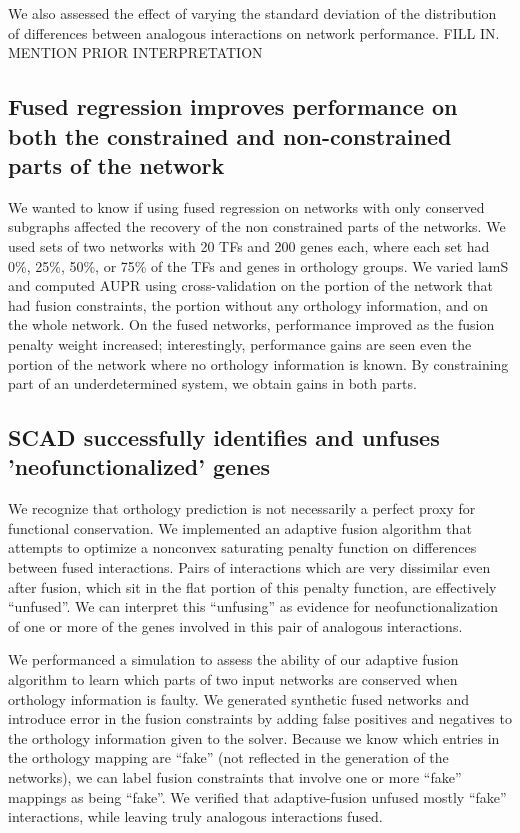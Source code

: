 \documentclass[11pt]{article}
\begin{document}
We also assessed the effect of varying the standard deviation of the distribution of differences between analogous interactions on network performance. FILL IN. MENTION PRIOR INTERPRETATION

\subsection{Fused regression improves performance on both the constrained and non-constrained parts of the network}
We wanted to know if using fused regression on networks with only conserved subgraphs affected the recovery of the non constrained parts of the networks. We used sets of two networks with 20 TFs and 200 genes each, where each set had 0\%, 25\%, 50\%, or 75\% of the TFs and genes in orthology groups. We varied lamS and computed AUPR using cross-validation on the portion of the network that had fusion constraints, the portion without any orthology information, and on the whole network. On the fused networks, performance improved as the fusion penalty weight increased; interestingly, performance gains are seen even the portion of the network where no orthology information is known. By constraining part of an underdetermined system, we obtain gains in both parts. 

\subsection{SCAD successfully identifies and unfuses 'neofunctionalized' genes}
We recognize that orthology prediction is not necessarily a perfect proxy for functional conservation. We implemented an adaptive fusion algorithm that attempts to optimize a nonconvex saturating penalty function on differences between fused interactions. Pairs of interactions which are very dissimilar even after fusion, which sit in the flat portion of this penalty function, are effectively ``unfused''. We can interpret this ``unfusing'' as evidence for neofunctionalization of one or more of the genes involved in this pair of analogous interactions. 

We performanced a simulation to assess the ability of our adaptive fusion algorithm to learn which parts of two input networks are conserved when orthology information is faulty. We generated synthetic fused networks and introduce error in the fusion constraints by adding false positives and negatives to the orthology information given to the solver. Because we know which entries in the orthology mapping are ``fake'' (not reflected in the generation of the networks), we can label fusion constraints that involve one or more ``fake'' mappings as being ``fake''. We verified that adaptive-fusion unfused mostly ``fake'' interactions, while leaving truly analogous interactions fused.
\end{document}

